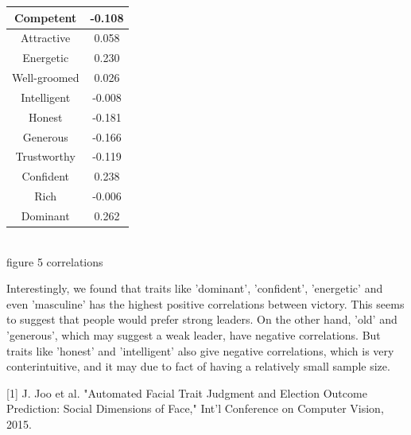 \documentclass[12pt]{article}
\newenvironment{p4}[2][V Predicting Election Outcomes with Face Social Attributes]{\begin{trivlist}
\item[\hskip \labelsep {\bfseries #1}\hskip \labelsep {\bfseries #2}]}{\end{trivlist}}
\newenvironment{p5}[2][VI References]{\begin{trivlist}
\item[\hskip \labelsep {\bfseries #1}\hskip \labelsep {\bfseries #2}]}{\end{trivlist}}
\begin{document}
\begin{p4}{}
\begin{center}
\begin{tabular}{||c c||}
		\hline
		Competent & -0.108\\
		\hline
		Attractive & 0.058\\
		\hline
		Energetic & 0.230\\
		\hline
		Well-groomed & 0.026\\
		\hline
		Intelligent & -0.008\\
		\hline
		Honest & -0.181\\
		\hline
		Generous & -0.166\\
		\hline
		Trustworthy & -0.119\\
		\hline
		Confident & 0.238\\
		\hline
		Rich & -0.006\\
		\hline
		Dominant & 0.262\\
		\hline
	\end{tabular}
	{\\figure 5 correlations}
\end{center}
Interestingly, we found that traits like 'dominant', 'confident', 'energetic' and even 'masculine' has the highest positive correlations between victory. This seems to suggest that people would prefer strong leaders. On the other hand, 'old' and 'generous', which may suggest a weak leader, have negative correlations. But traits like 'honest' and 'intelligent' also give negative correlations, which is very conterintuitive, and it may due to fact of having a relatively small sample size.
\end{p4}

\begin{p5}{}
\item{}
[1] J. Joo et al. "Automated Facial Trait Judgment and Election Outcome Prediction: Social Dimensions of Face," Int'l Conference on Computer Vision, 2015. 
\end{p5}

 
\end{document}
